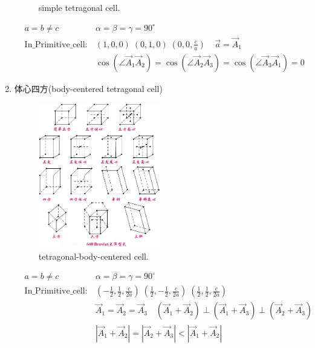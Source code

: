 \documentclass{article}      %
\begin{document}
\begin{enumerate}
\begin{figure}[h!]
\caption{\small simple tetragonal cell.}%
\label{Bravais:tetragonal cell}
\end{figure}
\begin{displaymath}
	\begin{aligned}
	&a=b\neq c &\alpha=\beta=\gamma=90^{\circ} \\
	&\mathrm{In\_Primitive\_cell}:&(1,0,0)\;(0,1,0)\;(0,0,\frac{c}{a})\;\;\;\;\vec a=\vec A_1\\
		& &\cos(\angle\vec A_1\vec A_2)=\cos(\angle\vec A_2\vec A_3)=\cos(\angle\vec A_3\vec A_1)=0
	\end{aligned}
\end{displaymath}
		\item 体心四方(\textrm{body-centered tetragonal cell})
\begin{figure}[h!]
\centering
\includegraphics[width=0.5\textwidth,viewport=120 185 245 325,clip]{Bravias.jpg}
\caption{\small tetragonal-body-centered cell.}%
\label{Bravais:tetragonal-body-centered}
\end{figure}
\begin{displaymath}
	\begin{aligned}
	&a=b\neq c & \alpha=\beta=\gamma=90^{\circ} \\
	&\mathrm{In\_Primitive\_cell}:&(-\frac12,\frac12,\frac{c}{2a})\;(\frac12,-\frac12,\frac{c}{2a})\;(\frac12,\frac12,\frac{c}{2a})\\
	& &\vec A_1=\vec A_2=\vec A_3\quad (\vec A_1+\vec A_2)\perp(\vec A_1+\vec A_3)\perp(\vec A_2+\vec A_3)\\
	& &|\vec A_1+\vec A_2|=|\vec A_2+\vec A_3|<|\vec A_1+\vec A_2|\\

\end{aligned}
\end{displaymath}
\end{enumerate}
\end{document}
